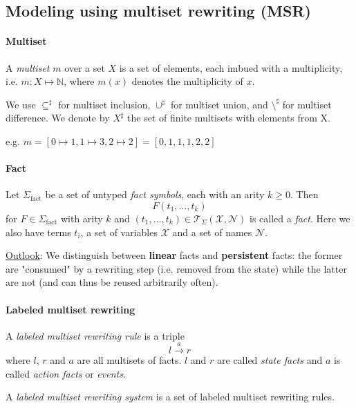 \pagebreak
\subsection{Modeling using multiset rewriting (MSR)}

\paragraph{Multiset} A \emph{multiset} $m$ over a set $X$ is a set of elements, each imbued with a multiplicity, i.e. $m: X \mapsto \mathbb{N}$, where $m(x)$ denotes the multiplicity of $x$.

We use $\subseteq^\sharp$ for multiset inclusion, $\cup^\sharp$ for multiset union, and $\setminus^\sharp$ for multiset difference.
We denote by $X^\sharp$ the set of finite multisets with elements from X.

e.g. $m = [0 \mapsto 1, 1 \mapsto 3, 2 \mapsto 2] = [0, 1, 1, 1, 2, 2]$

\paragraph{Fact} Let $\Sigma_{\text{fact}}$ be a set of untyped \emph{fact symbols}, each with an arity $k \geq 0$. Then
$$F(t_1,\dots,t_k)$$
for $F \in \Sigma_{\text{fact}}$ with arity $k$ and $(t_1,\dots,t_k) \in \mathcal{T}_\Sigma(\mathcal{X}, \mathcal{N})$ is called a \emph{fact}. Here we also have terms $t_i$, a set of variables $\mathcal{X}$ and a set of names $\mathcal{N}$.

\underline{Outlook}: We distinguish between \textbf{linear} facts and \textbf{persistent} facts: the former are "consumed" by a rewriting step (i.e. removed from the state) while the latter are not (and can thus be reused arbitrarily often).

\paragraph{Labeled multiset rewriting} A \emph{labeled multiset rewriting rule} is a triple 
$$l \xrightarrow{a} r$$
where $l$, $r$ and $a$ are all multisets of facts. $l$ and $r$ are called \emph{state facts} and $a$ is called \emph{action facts} or \emph{events}.

A \emph{labeled multiset rewriting system} is a set of labeled multiset rewriting rules.

\horizontaldivider

